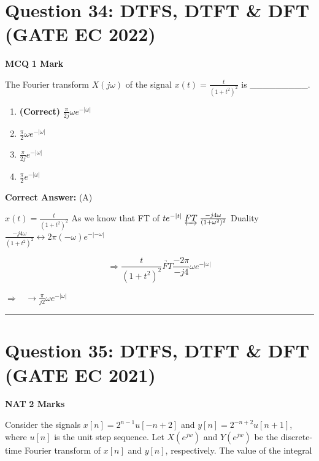 \documentclass[11pt,a4paper]{article}
\begin{document}
\section*{Question 34: DTFS, DTFT \& DFT (GATE EC 2022)}
\noindent \textbf{\color{primary}MCQ} \hfill \textbf{\color{secondary}1 Mark}


\noindent The Fourier transform $X(j\omega )$ of the signal $x(t)=\frac{t}{(1+t^2)^2}$ is   \_\_\_\_\_\_\_\_\_.


\begin{enumerate}[label=(\Alph*)]
    \item \textbf{(Correct)} $\frac{\pi}{2j}\omega e^{-|\omega|}$
    \item $\frac{\pi}{2}\omega e^{-|\omega|}$
    \item $\frac{\pi}{2j} e^{-|\omega|}$
    \item $\frac{\pi}{2} e^{-|\omega|}$
\end{enumerate}

\noindent \textbf{Correct Answer:} (A)

\begin{tcolorbox}[solbox, title=Detailed Solution -- Question 34]
$x(t)=\frac{t}{(1+t^2)^2}$
As we know that FT of
$te^{-|t|} \; \underleftrightarrow{FT} \;\frac{-j4\omega }{(1+\omega ^2)^2}$
Duality
$\frac{-j4\omega }{(1+t ^2)^2} \leftrightarrow 2 \pi(-\omega )e^{-|-\omega |}$

\[
\Rightarrow  \frac{t}{(1+t^2)^2} \underrightarrow{FT} \frac{-2\pi}{-j4}\omega e^{-|\omega |}
\]

$\Rightarrow \;\;\;\rightarrow\frac{\pi}{j2} \omega e^{-|\omega |}$
\end{tcolorbox}

\vspace{1.5em}
\hrule
\vspace{1.5em}

\section*{Question 35: DTFS, DTFT \& DFT (GATE EC 2021)}
\noindent \textbf{\color{primary}NAT} \hfill \textbf{\color{secondary}2 Marks}


\noindent Consider the signals $x\left [ n \right ]=2^{n-1}u\left [ -n+2 \right ]$
and $y\left [ n \right ]=2^{-n+2}u\left [ n+1 \right ]$, where $u[n]$
is the unit step sequence. Let $X(e^{jw})$
and $Y(e^{jw})$
be the discrete-time Fourier transform of $x[n]$
and $y[n]$, respectively. The value of the integral
\end{document}
